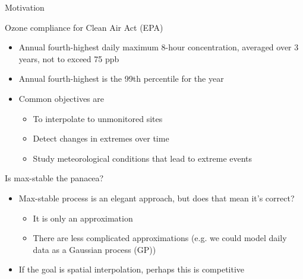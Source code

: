 \documentclass{beamer}
\begin{document}
\begin{frame}{Motivation}
	\begin{adjustwidth}{1em}{0em}
		Ozone compliance for Clean Air Act (EPA) \vspace{1em}
		\begin{itemize} \setlength{\itemsep}{1em}
			\item Annual fourth-highest daily maximum 8-hour concentration, averaged over 3 years, not to exceed 75 ppb
			\item Annual fourth-highest is the 99th percentile for the year
			\item Common objectives are \vspace{0.5em}
			\begin{itemize} \setlength{\itemsep}{0.5em}
				\item To interpolate to unmonitored sites
				\item Detect changes in extremes over time
				\item Study meteorological conditions that lead to extreme events
			\end{itemize}
		\end{itemize}
	\end{adjustwidth}
\end{frame}

\begin{frame}{Is max-stable the panacea?}
	\begin{itemize}\setlength{\itemsep}{1em}
		\item Max-stable process is an elegant approach, but does that mean it's correct? \vspace{0.5em}
		\begin{itemize} \setlength{\itemsep}{0.5em}
			\item It is only an approximation
			\item There are less complicated approximations (e.g. we could model daily data as a Gaussian process (GP))
		\end{itemize}
		\item If the goal is spatial interpolation, perhaps this is competitive
	\end{itemize}
\end{frame}
\end{document}
